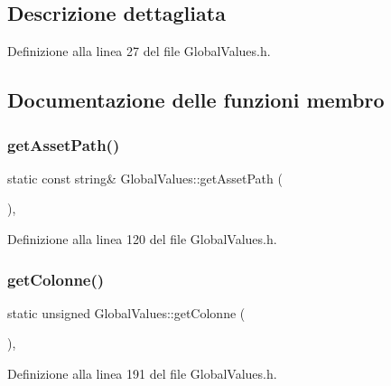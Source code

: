 \subsection{Descrizione dettagliata}


Definizione alla linea 27 del file Global\+Values.\+h.



\subsection{Documentazione delle funzioni membro}
\mbox{\label{class_global_values_a379ea0cf2c47f7644b9ee70b314dc8c0}} 
\subsubsection{\texorpdfstring{get\+Asset\+Path()}{getAssetPath()}}
{\footnotesize\ttfamily static const string\& Global\+Values\+::get\+Asset\+Path (\begin{DoxyParamCaption}{ }\end{DoxyParamCaption})\hspace{0.3cm}{\ttfamily [inline]}, {\ttfamily [static]}}



Definizione alla linea 120 del file Global\+Values.\+h.

\mbox{\label{class_global_values_a80a265f238b3861da7075770cc2dcb3e}} 
\subsubsection{\texorpdfstring{get\+Colonne()}{getColonne()}}
{\footnotesize\ttfamily static unsigned Global\+Values\+::get\+Colonne (\begin{DoxyParamCaption}{ }\end{DoxyParamCaption})\hspace{0.3cm}{\ttfamily [inline]}, {\ttfamily [static]}}



Definizione alla linea 191 del file Global\+Values.\+h.

\mbox{\label{class_global_values_a3ea604dc1f21655d57ad9486c60cbf7d}} 

